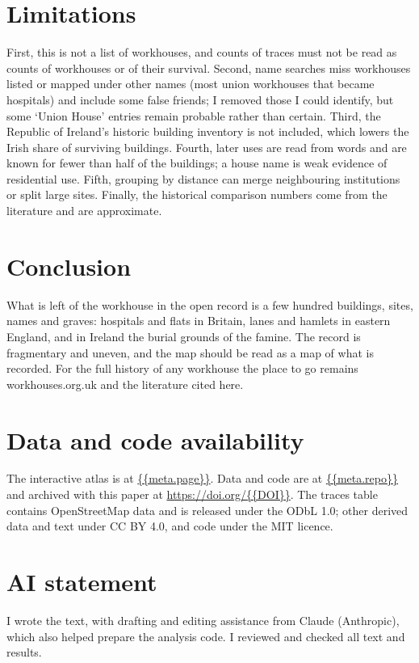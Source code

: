 \documentclass[11pt,a4paper]{article}
\begin{document}
\section{Limitations}
First, this is not a list of workhouses, and counts of traces must not be read as counts of workhouses or of their survival. Second, name searches miss workhouses listed or mapped under other names (most union workhouses that became hospitals) and include some false friends; I removed those I could identify, but some `Union House' entries remain probable rather than certain. Third, the Republic of Ireland's historic building inventory is not included, which lowers the Irish share of surviving buildings. Fourth, later uses are read from words and are known for fewer than half of the buildings; a house name is weak evidence of residential use. Fifth, grouping by distance can merge neighbouring institutions or split large sites. Finally, the historical comparison numbers come from the literature and are approximate.

\section{Conclusion}
What is left of the workhouse in the open record is a few hundred buildings, sites, names and graves: hospitals and flats in Britain, lanes and hamlets in eastern England, and in Ireland the burial grounds of the famine. The record is fragmentary and uneven, and the map should be read as a map of what is recorded. For the full history of any workhouse the place to go remains workhouses.org.uk and the literature cited here.

\section*{Data and code availability}
The interactive atlas is at \url{{{meta.page}}}. Data and code are at \url{{{meta.repo}}} and archived with this paper at \url{https://doi.org/{{DOI}}}. The traces table contains OpenStreetMap data and is released under the ODbL 1.0; other derived data and text under CC BY 4.0, and code under the MIT licence.

\section*{AI statement}
I wrote the text, with drafting and editing assistance from Claude (Anthropic), which also helped prepare the analysis code. I reviewed and checked all text and results.
\end{document}
